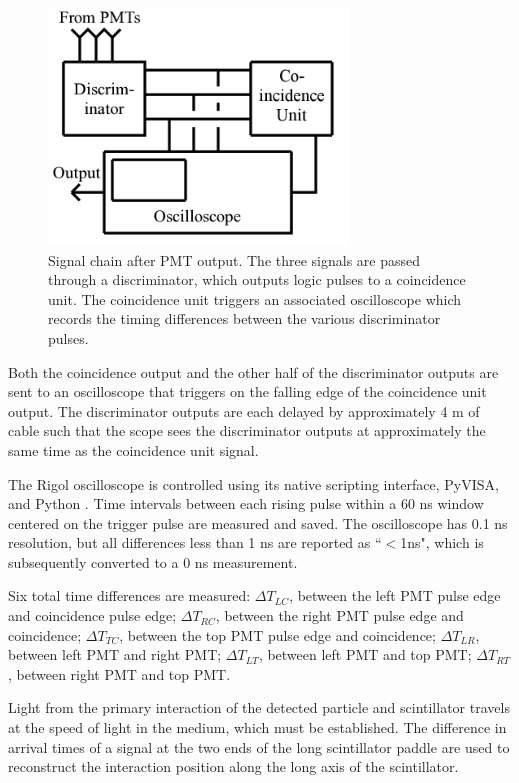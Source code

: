 \begin{figure}[htb]
\includegraphics[width=8cm]{chain.png}
\caption{Signal chain after PMT output. The three signals are passed through a discriminator, which outputs logic pulses to a coincidence unit. The coincidence unit triggers an associated oscilloscope which records the timing differences between the various discriminator pulses. }
\label{chain}
\end{figure}

Both the coincidence output and the other half of the discriminator outputs are sent to an oscilloscope that triggers on the falling edge of the coincidence unit output. The discriminator outputs are each delayed by approximately 4 m of cable such that the scope sees the discriminator outputs at approximately the same time as the coincidence unit signal. 

The Rigol oscilloscope is controlled using its native scripting interface, PyVISA, and Python \cite{teq,pyvisa,python}. Time intervals between each rising pulse within a 60 ns window centered on the trigger pulse are measured and saved. The oscilloscope has 0.1 ns resolution, but all differences less than 1 ns are reported as ``$<$1ns", which is subsequently converted to a 0 ns measurement.

Six total time differences are measured: $\Delta T_{LC}$, between the left PMT pulse edge and coincidence pulse edge; $\Delta T_{RC}$, between the right PMT pulse edge and coincidence; $\Delta T_{TC}$, between the top PMT pulse edge and coincidence; $\Delta T_{LR}$, between left PMT and right PMT; $\Delta T_{LT}$, between left PMT and top PMT; $\Delta T_{RT}$, between right PMT and top PMT.

Light from the primary interaction of the detected particle and scintillator travels at the speed of light in the medium, which must be established. The difference in arrival times of a signal at the two ends of the long scintillator paddle are used to reconstruct the interaction position along the long axis of the scintillator. 

